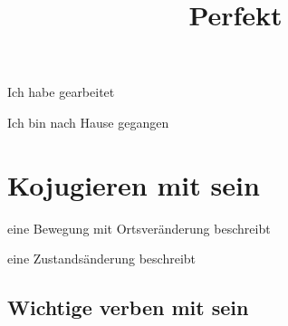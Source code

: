 \documentclass[a4paper]{article}
\title{Perfekt}
\begin{document}
    \maketitle
    
    Ich habe gearbeitet
    
    Ich bin nach Hause gegangen
    
    \section{Kojugieren mit sein}
        eine Bewegung mit Ortsveränderung beschreibt
        
        eine Zustandsänderung beschreibt
    
        \subsection{Wichtige verben mit sein}
    
\end{document}
